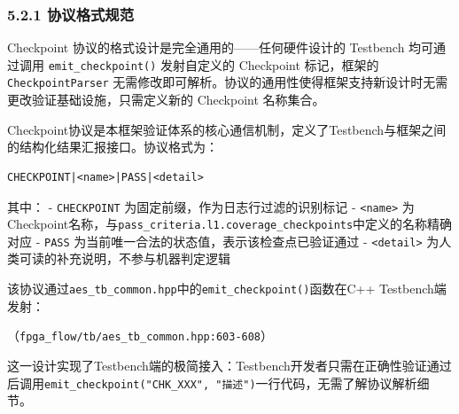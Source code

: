 \subsubsection{5.2.1
协议格式规范}\label{ux534fux8baeux683cux5f0fux89c4ux8303}

Checkpoint 协议的格式设计是完全通用的------任何硬件设计的 Testbench
均可通过调用 \texttt{emit\_checkpoint()} 发射自定义的 Checkpoint
标记，框架的 \texttt{CheckpointParser}
无需修改即可解析。协议的通用性使得框架支持新设计时无需更改验证基础设施，只需定义新的
Checkpoint 名称集合。

Checkpoint协议是本框架验证体系的核心通信机制，定义了Testbench与框架之间的结构化结果汇报接口。协议格式为：

\begin{verbatim}
CHECKPOINT|<name>|PASS|<detail>
\end{verbatim}

其中： - \texttt{CHECKPOINT} 为固定前缀，作为日志行过滤的识别标记 -
\texttt{\textless{}name\textgreater{}}
为Checkpoint名称，与\texttt{pass\_criteria.l1.coverage\_checkpoints}中定义的名称精确对应
- \texttt{PASS} 为当前唯一合法的状态值，表示该检查点已验证通过 -
\texttt{\textless{}detail\textgreater{}}
为人类可读的补充说明，不参与机器判定逻辑

该协议通过\texttt{aes\_tb\_common.hpp}中的\texttt{emit\_checkpoint()}函数在C++
Testbench端发射：

\begin{Shaded}
\begin{Highlighting}[]
 \OperatorTok{(}
     \OperatorTok{\&}\OperatorTok{,}
     \OperatorTok{\&}
\OperatorTok{)} \OperatorTok{\{}
    \OperatorTok{\textless{}\textless{}}  \OperatorTok{\textless{}\textless{}}\OperatorTok{\textless{}\textless{}}  \OperatorTok{\textless{}\textless{}}\OperatorTok{\textless{}\textless{}} \OperatorTok{;}
\OperatorTok{\}}
\end{Highlighting}
\end{Shaded}

（\texttt{fpga\_flow/tb/aes\_tb\_common.hpp:603-608}）

这一设计实现了Testbench端的极简接入：Testbench开发者只需在正确性验证通过后调用\texttt{emit\_checkpoint("CHK\_XXX",\ "描述")}一行代码，无需了解协议解析细节。

